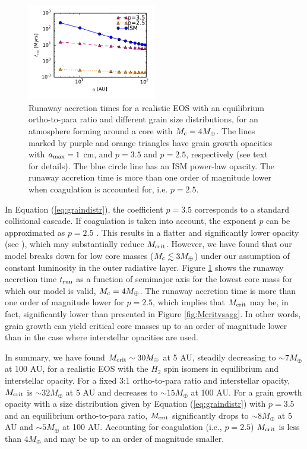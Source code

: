 \begin{figure}[h!]
\centering
\includegraphics[width=0.5\textwidth]{figures/tco_vs_a_Mc4_comp.pdf}
\caption{Runaway accretion times for a realistic EOS with an equilibrium ortho-to-para ratio and different grain size distributions, for an atmosphere forming around a core with $M_{\rm c}=4 M_{\oplus}$. The lines marked by purple and orange triangles have grain growth opacities with $a_{\rm max}=1$ cm, and $p=3.5$ and $p=2.5$, respectively (see text for details). The blue circle line has an ISM power-law opacity. The runaway accretion time is more than one order of magnitude lower when coagulation is accounted for, i.e. $p=2.5$.}
\label{fig:p25p35}
\end{figure}

In Equation (\ref{eq:graindistr}), the coefficient $p=3.5$ corresponds to a standard collisional cascade. If coagulation is taken into account, the exponent $p$ can be approximated as $p=2.5$ \citep{dalessio01}. This results in a flatter and significantly lower opacity (see ), which may substantially reduce $M_{\rm crit}$. However, we have found that our model breaks down for low core masses ($M_{\rm c} \lesssim 3 M_{\oplus}$) under our assumption of constant luminosity in the outer radiative layer. Figure \ref{fig:p25p35} shows the runaway accretion time $t_{\rm run}$ as a function of semimajor axis for the lowest core mass for which our model is valid, $M_{\rm c}=4 M_{\oplus}$. The runaway accretion time is more than one order of magnitude lower for $p=2.5$, which implies that $M_{\rm crit}$ may be, in fact, significantly lower than presented in Figure \ref{fig:Mcritvsagg}. In other words, grain growth can yield critical core masses up to an order of magnitude lower than in the case where interstellar opacities are used.

In summary, we have found $M_{\rm crit}\sim 30 M_{\oplus}$ at 5 AU, steadily decreasing to $\sim$$7 M_{\oplus}$ at 100 AU, for a realistic EOS with the $H_2$ spin isomers in equilibrium and interstellar opacity. For a fixed 3:1 ortho-to-para ratio and interstellar opacity, $M_{\rm crit}$ is $\sim$$32 M_{\oplus}$ at 5 AU and decreases to $\sim$$15 M_{\oplus}$ at 100 AU. For a grain growth opacity with a size distribution given by Equation (\ref{eq:graindistr}) with $p=3.5$ and an equilibrium ortho-to-para ratio, $M_{\rm crit}$ significantly drops to $\sim$$8 M_{\oplus}$ at 5 AU and $\sim$$5 M_{\oplus}$ at 100 AU. Accounting for coagulation (i.e., $p=2.5$) $M_{\rm crit}$ is less than $4M_\oplus$ and may be up to an order of magnitude smaller.

